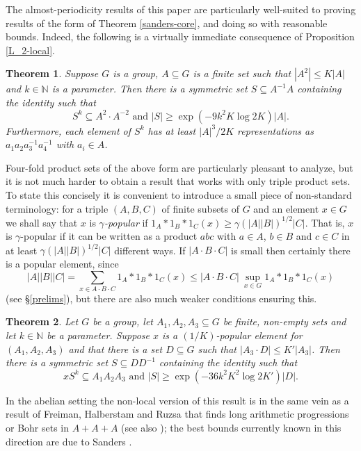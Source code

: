 \documentclass[12pt,a4paper,reqno]{amsart}
\numberwithin{equation}{section}
\theoremstyle{plain}
\newtheorem{theorem}{Theorem}[section]
\theoremstyle{definition}
\renewcommand{\leq}{\leqslant}
\renewcommand{\geq}{\geqslant}
\renewcommand{\subset}{\subseteq}
\def\N{\mathbb{N}}
\begin{document}
The almost-periodicity results of this paper are particularly well-suited to proving results of the form of Theorem \ref{sanders-core}, and doing so with reasonable bounds. Indeed, the following is a virtually immediate consequence of Proposition \ref{L_2-local}.

\begin{theorem}\label{core_set}
Suppose $G$ is a group, $A \subset G$ is a finite set such that $|A^2| \leq K|A|$ and $k \in \N$ is a parameter. Then there is a symmetric set $S \subset A^{-1} A$ containing the identity such that 
\[ S^k \subset A^2 \cdot A^{-2}  \text{ and }  |S| \geq \exp\left(-9k^2 K \log{2K} \right) |A|. \]
Furthermore, each element of $S^k$ has at least $|A|^3/2K$ representations as $a_1 a_2 a_3^{-1} a_4^{-1}$ with $a_i \in A$. 
\end{theorem}

Four-fold product sets of the above form are particularly pleasant to analyze, but it is not much harder to obtain a result that works with only triple product sets. To state this concisely it is convenient to introduce a small piece of non-standard terminology: for a triple $(A, B, C)$ of finite subsets of $G$ and an element $x \in G$ we shall say that $x$ is \emph{$\gamma$-popular} if $1_A*1_B*1_C(x) \geq \gamma (|A||B|)^{1/2} |C|$. That is, $x$ is $\gamma$-popular if it can be written as a product $abc$ with $a \in A$, $b \in B$ and $c \in C$ in at least $\gamma (|A||B|)^{1/2} |C|$ different ways. If $|A \cdot B \cdot C|$ is small then certainly there is a popular element, since
\[ |A||B||C| = \sum_{x \in A\cdot B \cdot C} 1_A*1_B*1_C(x) \leq |A\cdot B \cdot C|\ \sup_{x \in G} 1_A*1_B*1_C(x) \]
(see \S\ref{prelims}), but there are also much weaker conditions ensuring this.

\begin{theorem}\label{ABC}
Let $G$ be a group, let $A_1, A_2, A_3 \subset G$ be finite, non-empty sets and let $k \in \N$ be a parameter. Suppose $x$ is a $(1/K)$-popular element for $(A_1, A_2, A_3)$ and that there is a set $D \subset G$ such that $|A_3 \cdot D| \leq K'|A_3|$. Then there is a symmetric set $S \subset D D^{-1}$ containing the identity such that 
\[ x S^k \subset A_1  A_2  A_3 \text{ and }  |S| \geq \exp\left(-36 k^2 K^2 \log{2K'} \right) |D|. \]
\end{theorem}

In the abelian setting the non-local version of this result is in the same vein as a result of Freiman, Halberstam and Ruzsa \cite{freiman-halberstam-ruzsa} that finds long arithmetic progressions or Bohr sets in $A+A+A$ (see also \cite[Theorem 4.43]{tao-vu}); the best bounds currently known in this direction are due to Sanders \cite{sanders:longAPs}.
\end{document}
